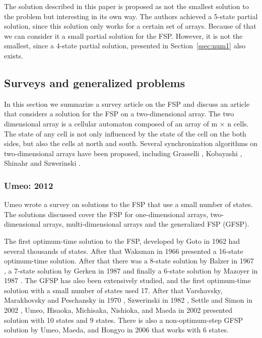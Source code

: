 \documentclass{article}
\begin{document}
The solution described in this paper is proposed as not the smallest solution to the problem but interesting in its own way. The authors achieved a 5-state partial solution, since this solution only works for a certain set of arrays. Because of that we can consider it a small partial solution for the FSP. However, it is not the smallest, since a 4-state partial solution, presented in Section~\ref{ssec:num1}  also exists.

\subsection{Surveys and generalized problems}
In this section we summarize a survey article on the FSP and discuss an article that considers a solution for the FSP on a two-dimensional array. The two dimensional array is a cellular automaton composed of an array of m × n cells. The state of any cell is not only influenced by the state of the cell on the both sides, but also the cells at north and south. Several synchronization algorithms on two-dimensional arrays have been proposed, including Grasselli \cite{grasselli1975synchronization}, Kobayashi \cite{kobayashi1977firing}, Shinahr \cite{shinahr1974two} and Szwerinski \cite{szwerinski1982time}.

\subsubsection{Umeo: 2012}

Umeo wrote a survey on solutions to the FSP that use a small number of states\cite{umeo2012recent}. The solutions discussed cover the FSP for one-dimensional arrays, two-dimensional arrays, multi-dimensional arrays and the generalized FSP (GFSP).

The first optimum-time solution to the FSP, developed by Goto in 1962 \cite{Goto1962} had several thousands of states. After that Waksman in 1966 \cite{waksman1966optimum} presented a 16-state optimum-time solution. After that there was a 8-state solution by Balzer in 1967 \cite{Balzer1967}, a 7-state solution by Gerken in 1987 \cite{gerken1987synchronisations} and finally a 6-state solution by Mazoyer in 1987 \cite{Mazoyer1987}. The GFSP has also been extensively studied, and the first optimum-time solution with a small number of states used 17. After that Varshavsky, Marakhovsky and Peschansky in 1970 \cite{VMP1970}, Szwerinski in 1982 \cite{szwerinski1982time}, Settle and Simon in 2002 \cite{settle2002smaller}, Umeo, Hisaoka, Michisaka, Nishioka, and Maeda in 2002 \cite{umeo2003synchronization} presented solution with 10 states and 9 states. There is also a non-optimum-step GFSP solution by Umeo, Maeda, and Hongyo in 2006 \cite{umeo2006design} that works with 6 states.
\end{document}
